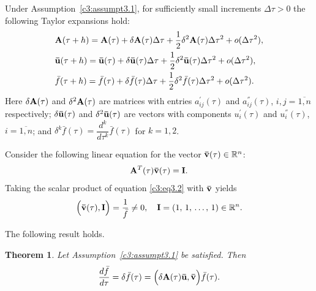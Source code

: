 \documentclass[12pt]{report}
\newtheorem{theorem}{Theorem}[section]
\theoremstyle{definition}
\theoremstyle{remark}
\begin{document}
Under Assumption~\ref{c3:assumpt3.1}, for sufficiently small increments $\Delta \tau > 0$ the following Taylor expansions hold:
\begin{equation}
	\begin{aligned}	
		&\displaystyle{\bf A}(\tau + h) = {\bf A}(\tau) + \delta{\bf A}(\tau)\Delta\tau + \dfrac{1}{2}\delta^{2}{\bf A}(\tau)\Delta\tau^{2} + o(\Delta\tau^{2}), \\		
		&\displaystyle{\bf \bar{u}}(\tau + h) = {\bf \bar{u}}(\tau) + \delta {\bf \bar{u}}(\tau)\Delta\tau + \dfrac{1}{2}\delta^{2}{\bf \bar{u}}(\tau)\Delta\tau^{2} + o(\Delta\tau^{2}), \\		
		&\displaystyle\bar{f}(\tau + h) = \bar{f}(\tau) + \delta\bar{f}(\tau)\Delta\tau + \dfrac{1}{2}\delta^{2}\bar{f}(\tau)\Delta\tau^{2} + o(\Delta\tau^{2}).
	\end{aligned}
	\label{c3:eq3.5}
\end{equation}
Here $\delta{\bf A}(\tau)$ and $\delta^{2}{\bf A}(\tau)$ are matrices with entries $a_{ij}^{'}(\tau)$ and $a_{ij}^{''}(\tau)$, $i, j = \overline{1, n}$ respectively; $\delta{\bf \bar{u}}(\tau)$ and $\delta^{2}{\bf \bar{u}}(\tau)$ are vectors with components $u_{i}^{'}(\tau)$ and $u_{i}^{''}(\tau)$, $i = \overline{1, n}$; and $\delta^{k}\bar{f}(\tau) = \dfrac{d^{k}}{d\tau^{k}}\bar{f}(\tau)$ for $k = 1, 2$.

Consider the following linear equation for the vector ${\bf \bar{v}}(\tau) \in \mathbb{R}^{n}$:
\begin{equation}
	{\bf A}^{T}(\tau){\bf \bar{v}}(\tau) = {\bf I}.
	\label{c3:eq3.6}
\end{equation}
Taking the scalar product of equation \eqref{c3:eq3.2} with ${\bf \bar{v}}$ yields
$$
	\Big({\bf \bar{v}}(\tau), {\bf I}\Big) = \frac{1}{\bar{f}} \neq 0, \quad {\bf I} = (1,\, 1,\, \ldots,\, 1) \in \mathbb{R}^{n}.
$$

The following result holds.

\begin{theorem}\label{c3:theorem:3.1}	Let Assumption~\ref{c3:assumpt3.1} be satisfied. Then
	\begin{equation}
		\frac{d\bar{f}}{d\tau} = \delta\bar{f}(\tau) = \Big(\delta{\bf A}(\tau){\bf \bar{u}, \bar{v}}\Big)\bar{f}(\tau).
		\label{c3:eq3.7}
	\end{equation}
\end{theorem}
\end{document}
